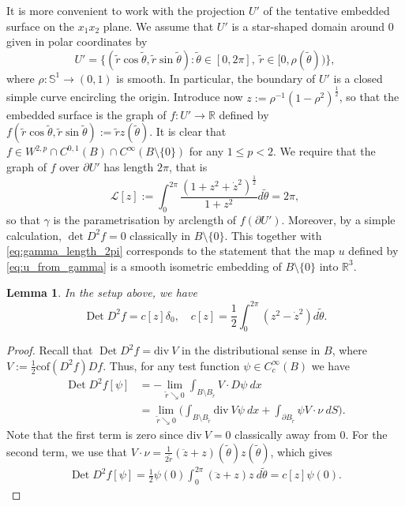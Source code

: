 \documentclass[12pt]{article}
\newcommand{\R}{\mathbb{R}}
\newcommand{\Det}{\operatorname{Det}}
\theoremstyle{plain}
\newtheorem{lemma}[theorem]{Lemma}
\numberwithin{equation}{section}
\begin{document}
It is more convenient to work with the projection $U'$ of the tentative embedded surface on the $x_1 x_2$ plane. We assume that $U'$ is a star-shaped domain around $0$ given in polar coordinates by
\begin{equation*}
    U' = \big\{ (\tilde r \cos\tilde\theta, \tilde r \sin\tilde\theta) : \tilde\theta \in [0,2\pi], ~\tilde r \in [0,\rho(\tilde\theta)) \big\}, 
\end{equation*}
where $\rho : \mathbb{S}^1 \to (0,1)$ is smooth. In particular, the boundary of $U'$ is a closed simple curve encircling the origin. Introduce now $    z := \rho^{-1}(1-\rho^2)^\frac12$,
so that the embedded surface is the graph of $f : U' \to \mathbb{R}$ defined by $   f(\tilde r \cos\tilde\theta, \tilde r\sin\tilde\theta) := \tilde r z(\tilde\theta)$. It is clear that $f \in W^{2,p} \cap C^{0,1}(B) \cap C^\infty(B \setminus \{0\})$ for any $1 \leq p < 2$. We require that the graph of $f$ over $\partial U'$ has length $2\pi$, that is
\begin{equation} \label{eq:gamma_length_2pi}
      \mathcal{L}[z] := \int_0^{2\pi} \frac {(1+z^2 + \dot{z}^2)^{\frac12}} {1+z^2} d\tilde\theta = 2\pi,
\end{equation}
so that $\gamma$ is the parametrisation by arclength of $f(\partial U')$. Moreover, by a simple calculation, $\det D^2 f = 0$ classically in $B \setminus \{0\}$. This together with \eqref{eq:gamma_length_2pi} corresponds to the statement that the map $u$ defined by \eqref{eq:u_from_gamma} is a smooth isometric embedding of $B \setminus \{0\}$ into $\R^3$.
\begin{lemma} \label{lemma:detD2_cone}
    In the setup above, we have
    \begin{equation} \label{eq:def_c}
        \Det D^2 f = c[z] \delta_0, \quad c[z] = \frac12 \int_0^{2\pi} (z^2 - \dot z^2) d\tilde\theta.
    \end{equation}
\end{lemma}
\begin{proof}
    Recall that $\Det D^2f = \mathrm{div}~V$ in the distributional sense in $B$, where $V := \frac12 \mathrm{cof}(D^2f) Df$. Thus, for any test function $\psi \in C^\infty_c(B)$ we have
    \begin{align*}
         \Det D^2 f[\psi] &= -\lim_{\tilde r \searrow 0} \int_{B \setminus B_{\tilde r}} V \cdot D\psi~dx\\
         &= \lim_{\tilde r \searrow 0} \Big( \int_{B \setminus B_{\tilde r}} \mathrm{div}~V \psi~dx + \int_{\partial B_{\tilde r}} \psi V \cdot \nu ~dS  \Big).
    \end{align*}
    Note that the first term is zero since $\mathrm{div}~V = 0$ classically away from $0$. For the second term, we use that
    $V \cdot \nu = \frac1{2\tilde r}(\ddot z + z)(\tilde\theta) z(\tilde\theta)$, which gives
    \begin{align*}
        \Det D^2 f[\psi] = \frac12 \psi(0) \int_0^{2\pi} (\ddot z + z) z~d\tilde\theta = c[z]\psi(0).
    \end{align*}
\end{proof}
\end{document}
